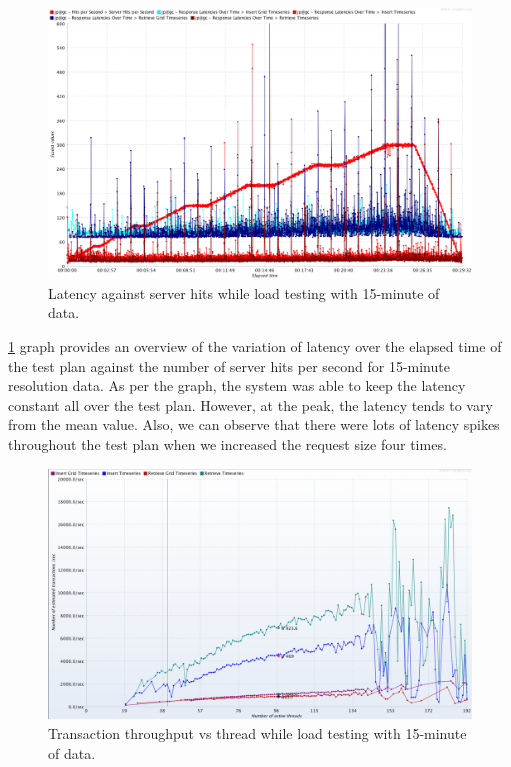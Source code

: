\begin{figure}[htp]
    \centering
    \includegraphics[width=1.0\textwidth]{results/obs/all/obs_all_15m_res_latencies_against_hits.png}
    \caption{Latency against server hits while load testing with 15-minute of data.}
    \label{fi:test_obs_all_15m_latency}
\end{figure}

\cref{fi:test_obs_all_15m_latency} graph provides an overview of the variation of latency over the elapsed time of the test plan against the number of server hits per second for 15-minute resolution data. As per the graph, the system was able to keep the latency constant all over the test plan. However, at the peak, the latency tends to vary from the mean value. Also, we can observe that there were lots of latency spikes throughout the test plan when we increased the request size four times.

\begin{figure}[htp]
    \centering
    \includegraphics[width=1.0\textwidth]{results/obs/all/obs_all_15m_transaction_throughtput_vs_threads.png}
    \caption{Transaction throughput vs thread while load testing with 15-minute of data.}
    \label{fi:test_obs_all_15m_throughtput}
\end{figure}

